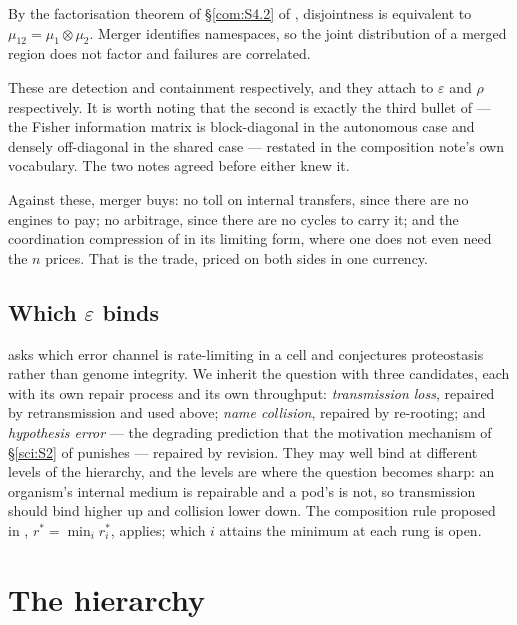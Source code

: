\begin{proposition}\label{eng:merger-destroys-independence}
By the factorisation theorem of \S\ref{com:S4.2} of \chComp, disjointness is
equivalent to $\mu_{12} = \mu_1 \otimes \mu_2$. Merger identifies
namespaces, so the joint distribution of a merged region does not factor
and failures are correlated.
\end{proposition}

These are detection and containment respectively, and they attach to
$\varepsilon$ and $\rho$ respectively. It is worth noting that the second
is exactly the third bullet of \cite[\S1]{compaut} --- the Fisher
information matrix is block-diagonal in the autonomous case and densely
off-diagonal in the shared case --- restated in the composition note's own
vocabulary. The two notes agreed before either knew it.

Against these, merger buys: no toll on internal transfers, since there are
no engines to pay; no arbitrage, since there are no cycles to carry it; and
the coordination compression of \cite[\S5]{vtok} in its limiting form,
where one does not even need the $n$ prices. That is the trade, priced on
both sides in one currency.

\subsection{Which $\varepsilon$ binds}\label{eng:S8.6}
\label{eng:sec:whicheps}

\cite{compaut} asks which error channel is rate-limiting in a cell and
conjectures proteostasis rather than genome integrity. We inherit the
question with three candidates, each with its own repair process and its
own throughput: \emph{transmission loss}, repaired by retransmission and
used above; \emph{name collision}, repaired by re-rooting; and
\emph{hypothesis error} --- the degrading prediction that the motivation
mechanism of \S\ref{sci:S2} of \chSci punishes --- repaired by revision. They
may well bind at different levels of the hierarchy, and the levels are
where the question becomes sharp: an organism's internal medium is
repairable and a pod's is not, so transmission should bind higher up and
collision lower down. The composition rule proposed in \cite{compaut},
$r^\ast = \min_i r^\ast_i$, applies; which $i$ attains the minimum at each
rung is open.

\section{The hierarchy}\label{eng:S9}
\label{eng:sec:hier}

